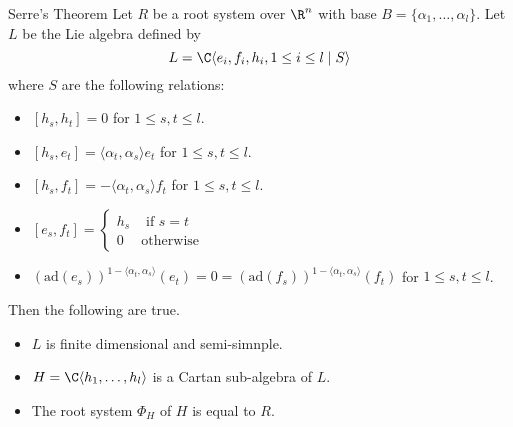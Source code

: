 \documentclass[a4paper]{article}
\begin{document}
\begin{thm}{Serre's Theorem}{} Let $R$ be a root system over $\R^n$ with base $B=\{\alpha_1,\dots,\alpha_l\}$. Let $L$ be the Lie algebra defined by $$L=\C\langle e_i,f_i,h_i, 1\leq i\leq l\;|\;S\rangle$$ where $S$ are the following relations: 
\begin{itemize}
\item $[h_s,h_t]=0$ for $1\leq s,t\leq l$. 
\item $[h_s,e_t]=\langle\alpha_t,\alpha_s\rangle e_t$ for $1\leq s,t\leq l$. 
\item $[h_s,f_t]=-\langle\alpha_t,\alpha_s\rangle f_t$ for $1\leq s,t\leq l$. 
\item $[e_s,f_t]=\begin{cases}
h_s & \text{ if } s=t\\
0 & \text{otherwise}
\end{cases}$
\item $\left(\text{ad}(e_s)\right)^{1-\langle\alpha_t,\alpha_s\rangle}(e_t)=0=\left(\text{ad}(f_s)\right)^{1-\langle\alpha_t,\alpha_s\rangle}(f_t)$ for $1\leq s,t\leq l$. 
\end{itemize}
Then the following are true. 
\begin{itemize}
\item $L$ is finite dimensional and semi-simnple. 
\item $H=\C\langle h_1,\dots,h_l\rangle$ is a Cartan sub-algebra of $L$. 
\item The root system $\Phi_H$ of $H$ is equal to $R$. 
\end{itemize}
\end{thm}
\end{document}
